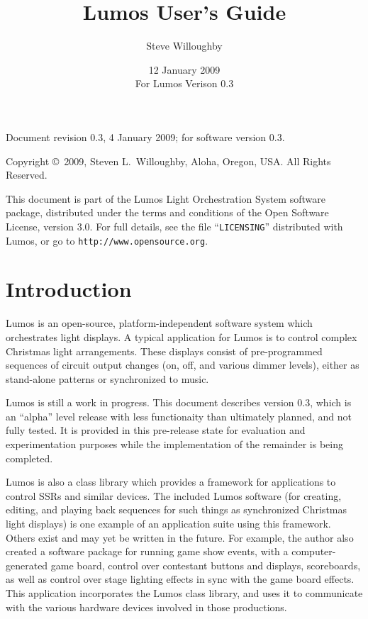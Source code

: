 \documentclass{article}
\begin{document}
\title{Lumos User's Guide}
\author{Steve Willoughby}
\date{12 January 2009 \\ For Lumos Verison 0.3}
\maketitle
\tableofcontents
\pagebreak
\vfill
\begin{flushleft}
Document revision 0.3, 4 January 2009;
for software version 0.3.

Copyright \copyright\ 2009, Steven L.\ Willoughby,
Aloha, Oregon, USA.  All Rights Reserved.

This document is part of the Lumos Light Orchestration System software package, distributed under the terms and conditions of the Open Software License, version 3.0.  For full details, see the file ``{\tt LICENSING}'' distributed with Lumos, or go to {\tt http://www.opensource.org}.
\end{flushleft}
\pagebreak

\section{Introduction}
Lumos is an open-source, platform-independent software system which
orchestrates light displays.  A typical application for Lumos is to control
complex Christmas light arrangements.  These displays consist of
pre-programmed sequences of circuit output changes (on, off, and various
dimmer levels), either as stand-alone patterns or synchronized to music.

Lumos is still a work in progress.  This document describes version 0.3, which
is an ``alpha'' level release with less functionaity than ultimately planned,
and not fully tested.  It is provided in this pre-release state for evaluation 
and experimentation purposes while the implementation of the remainder is 
being completed.

Lumos is also a class library which provides a framework for applications
to control SSRs and similar devices.  The included Lumos software (for creating,
editing, and playing back sequences for such things as synchronized 
Christmas light displays) is one example of an application suite using this
framework.  Others exist and may yet be written in the future.  For example,
the author also created a software package for running game show events,
with a computer-generated game board, control over contestant buttons and
displays, scoreboards, as well as control over stage lighting effects
in sync with the game board effects.  This application incorporates the
Lumos class library, and uses it to communicate with the various hardware
devices involved in those productions.
\end{document}
